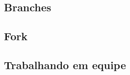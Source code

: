 \documentclass[xcolor=dvipsnames,t]{beamer}
\begin{document}
\subsection{Branches}
%
%
%
%
%

\subsection{Fork}

\subsection{Trabalhando em equipe}
\end{document}

